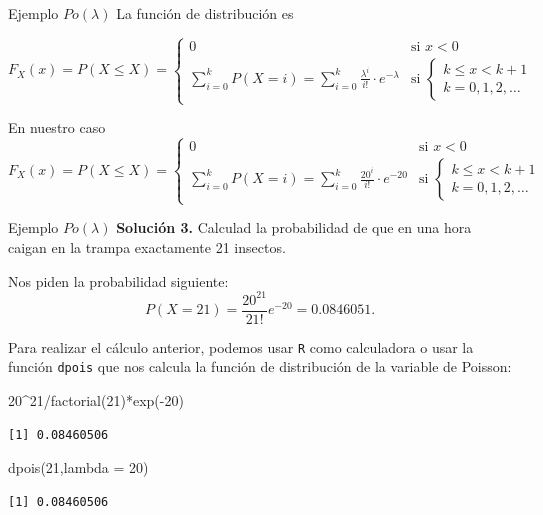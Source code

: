 \documentclass[
  ignorenonframetext,
  aspectratio=169]{beamer}
\newenvironment{Shaded}{\begin{snugshade}}{\end{snugshade}}
\newcommand{\AttributeTok}[1]{\textcolor[rgb]{0.40,0.45,0.13}{#1}}
\newcommand{\DecValTok}[1]{\textcolor[rgb]{0.68,0.00,0.00}{#1}}
\newcommand{\FunctionTok}[1]{\textcolor[rgb]{0.28,0.35,0.67}{#1}}
\newcommand{\NormalTok}[1]{\textcolor[rgb]{0.00,0.23,0.31}{#1}}
\newcommand{\SpecialCharTok}[1]{\textcolor[rgb]{0.37,0.37,0.37}{#1}}
\begin{document}
\begin{frame}{Ejemplo \(Po(\lambda)\)}
\protect\hypertarget{ejemplo-polambda-3}{}
La función de distribución es

\[
F_X(x)=P(X\leq X)=
\left\{\begin{array}{ll} 
0 & \mbox{si } x<0\\
\displaystyle\sum_{i=0}^{k} P(X=i)=\sum_{i=0}^{k}\frac{\lambda^i}{i!}\cdot e^{-\lambda} & \mbox{si  }
\left\{\begin{array}{l}
k\leq x< k+1\\k=0,1,2,\ldots
\end{array}
\right.
\end{array}
\right.
\]

En nuestro caso \[
F_X(x)=P(X\leq X)=
\left\{\begin{array}{ll} 
0 & \mbox{si } x<0\\
\displaystyle\sum_{i=0}^{k} P(X=i)=\sum_{i=0}^{k}\frac{20^i}{i!}\cdot e^{-20} & \mbox{si  }
\left\{\begin{array}{l}
k\leq x< k+1\\k=0,1,2,\ldots
\end{array}
\right.
\end{array}
\right.
\]
\end{frame}

\begin{frame}[fragile]{Ejemplo \(Po(\lambda)\)}
\protect\hypertarget{ejemplo-polambda-4}{}
\textbf{Solución 3.} Calculad la probabilidad de que en una hora caigan
en la trampa exactamente 21 insectos.

Nos piden la probabilidad siguiente: \[
P(X=21)=\frac{20^{21}}{21!} e^{-20}=0.0846051.
\]

Para realizar el cálculo anterior, podemos usar \texttt{R} como
calculadora o usar la función \texttt{dpois} que nos calcula la función
de distribución de la variable de Poisson:

\begin{Shaded}
\begin{Highlighting}[]
\DecValTok{20}\SpecialCharTok{\^{}}\DecValTok{21}\SpecialCharTok{/}\FunctionTok{factorial}\NormalTok{(}\DecValTok{21}\NormalTok{)}\SpecialCharTok{*}\FunctionTok{exp}\NormalTok{(}\SpecialCharTok{{-}}\DecValTok{20}\NormalTok{)}
\end{Highlighting}
\end{Shaded}

\begin{verbatim}
[1] 0.08460506
\end{verbatim}

\begin{Shaded}
\begin{Highlighting}[]
\FunctionTok{dpois}\NormalTok{(}\DecValTok{21}\NormalTok{,}\AttributeTok{lambda =} \DecValTok{20}\NormalTok{)}
\end{Highlighting}
\end{Shaded}

\begin{verbatim}
[1] 0.08460506
\end{verbatim}
\end{frame}
\end{document}
